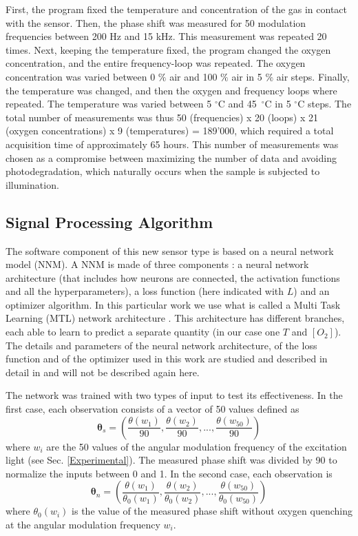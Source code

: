 \documentclass[sensors,article,submit,moreauthors,pdftex,10pt,a4paper]{Definitions/mdpi}
\begin{document}
First, the program fixed the temperature and concentration of the gas in contact with the sensor. Then, the phase shift was measured for 50 modulation frequencies between 200 Hz and 15 kHz. This measurement was repeated 20 times. Next, keeping the temperature fixed, the program changed the oxygen concentration, and the entire frequency-loop was repeated.
The oxygen concentration was varied between 0 $\%$ air and 100 $\%$ air in 5 $\%$ air steps.
Finally, the temperature was changed, and then the oxygen and frequency loops where repeated. The temperature was varied between 5 $^\circ$C and 45~$^\circ$C in 5 $^\circ$C steps.
The total number of measurements was thus 50 (frequencies) x 20 (loops) x 21 (oxygen concentrations) x 9 (temperatures) = 189'000, which required a total acquisition time of approximately 65 hours. This number of measurements was chosen as a compromise between maximizing the number of data and avoiding photodegradation, which naturally occurs when the sample is subjected to illumination. 


\subsection{Signal Processing Algorithm}
\label{NN}

The software component of this new sensor type is based on a neural network model (NNM). A NNM is made of three components \cite{Michelucci2017}: a neural network architecture (that includes how neurons are connected, the activation functions and all the hyperparameters), a loss function (here indicated with $L$) and an optimizer algorithm. In this particular work we use what is called a Multi Task Learning (MTL) network architecture \cite{caruana1997multitask}. This architecture has different branches, each able to learn to predict a separate quantity (in our case one $T$ and $[O_2]$). 
The details and parameters of the neural network architecture, of the loss function and of the optimizer used in this work are studied and described in detail in \cite{Michelucci2019_2} and will not be described again here.

The network was trained with two types of input to test its effectiveness. In the first case, each observation consists of a vector of 50 values defined as
\begin{equation}
\label{input1}
{\pmb \theta}_s = \left(
\frac{\theta(w_1)}{90} , \frac{\theta(w_2)}{90} , ..., \frac{\theta(w_{50})}{90} 
\right)
\end{equation}
where $w_i$ are the 50 values of the angular modulation frequency of the excitation light (see Sec. \ref{Experimental}). The measured phase shift was divided by 90 to normalize the inputs between 0 and 1. In the second case, each observation is
\begin{equation}
\label{input2}
{\pmb \theta}_n = \left(
\frac{\theta(w_1)}{\theta_0(w_1)} , \frac{\theta(w_2)}{\theta_0(w_2)} , ..., \frac{\theta(w_{50})}{\theta_0(w_{50})} 
\right)
\end{equation}
where $\theta_0(w_i)$ is the value of the measured phase shift without oxygen quenching at the angular modulation frequency $w_i$.
\end{document}

